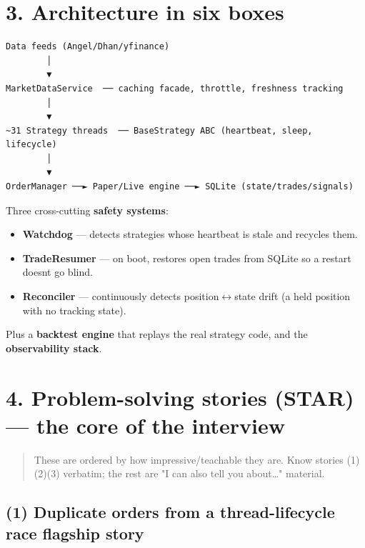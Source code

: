 \documentclass[11pt]{article}
\providecommand{\tightlist}{\setlength{\itemsep}{1pt}\setlength{\parskip}{0pt}}
\begin{document}
\section{3. Architecture in six boxes}\label{3-architecture-in-six-boxes}

\setcodelang{}

\begin{verbatim}
Data feeds (Angel/Dhan/yfinance)
        │
        ▼
MarketDataService  ── caching facade, throttle, freshness tracking
        │
        ▼
~31 Strategy threads  ── BaseStrategy ABC (heartbeat, sleep, lifecycle)
        │
        ▼
OrderManager ──► Paper/Live engine ──► SQLite (state/trades/signals)
\end{verbatim}

Three cross-cutting \textbf{safety systems}:

\begin{itemize}
\tightlist
\item
  \textbf{Watchdog} --- detects strategies whose heartbeat is stale and recycles them.
\item
  \textbf{TradeResumer} --- on boot, restores open trades from SQLite so a restart doesn\textquotesingle t go blind.
\item
  \textbf{Reconciler} --- continuously detects position\(\leftrightarrow\)state drift (a held position with no tracking state).
\end{itemize}

Plus a \textbf{backtest engine} that replays the real strategy code, and the \textbf{observability stack}.

\section{4. Problem-solving stories (STAR) --- the core of the interview}\label{4-problem-solving-stories-star--the-core-of-the-interview}

\begin{quote}
These are ordered by how impressive/teachable they are. Know stories (1)(2)(3) verbatim;
the rest are "I can also tell you about\ldots" material.
\end{quote}

\subsection{(1) Duplicate orders from a thread-lifecycle race flagship story}\label{1-duplicate-orders-from-a-thread-lifecycle-race-flagship-story}
\end{document}
